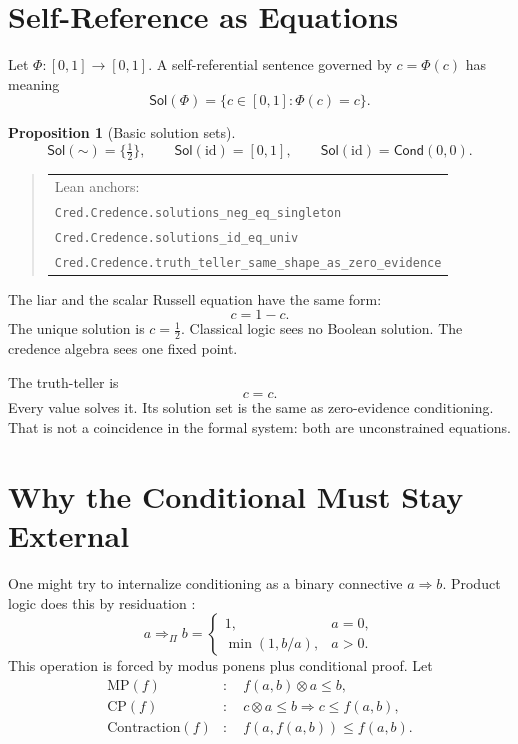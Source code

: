 \documentclass[11pt,a4paper]{article}
\newtheorem{proposition}[theorem]{Proposition}
\newcommand{\Cond}{\mathsf{Cond}}
\newcommand{\Sol}{\mathsf{Sol}}
\newcommand{\negc}{\mathord{\sim}}
\newcommand{\conjc}{\otimes}
\newcommand{\half}{\tfrac12}
\newcommand{\Lean}[1]{\texttt{#1}}
\begin{document}
\section{Self-Reference as Equations}

Let $\Phi:[0,1]\to[0,1]$.  A self-referential sentence governed by
$c=\Phi(c)$ has meaning
\[
  \Sol(\Phi)=\{c\in[0,1]:\Phi(c)=c\}.
\]

\begin{proposition}[Basic solution sets]
\label{prop:solution-sets}
\[
  \Sol(\negc)=\{\half\},\qquad
  \Sol(\mathrm{id})=[0,1],\qquad
  \Sol(\mathrm{id})=\Cond(0,0).
\]
\end{proposition}

\noindent
\begin{quote}\scriptsize
\begin{tabular}{@{}l@{}}
Lean anchors: \\
\Lean{Cred.Credence.solutions\_neg\_eq\_singleton}\\
\Lean{Cred.Credence.solutions\_id\_eq\_univ}\\
\Lean{Cred.Credence.truth\_teller\_same\_shape\_as\_zero\_evidence}
\end{tabular}
\end{quote}

The liar and the scalar Russell equation have the same form:
\[
  c=1-c.
\]
The unique solution is $c=\half$.  Classical logic sees no Boolean
solution.  The credence algebra sees one fixed point.

The truth-teller is
\[
  c=c.
\]
Every value solves it.  Its solution set is the same as zero-evidence
conditioning.  That is not a coincidence in the formal system: both
are unconstrained equations.

\section{Why the Conditional Must Stay External}

One might try to internalize conditioning as a binary connective
$a\Rightarrow b$.  Product logic does this by residuation
\cite{hajek1998,esteva2001,galatos2007}:
\[
  a\Rightarrow_{\Pi} b=
  \begin{cases}
    1, & a=0,\\
    \min(1,b/a), & a>0.
  \end{cases}
\]
This operation is forced by modus ponens plus conditional proof.
Let
\[
\begin{aligned}
\mathrm{MP}(f)&:\quad f(a,b)\conjc a\le b,\\
\mathrm{CP}(f)&:\quad c\conjc a\le b\Rightarrow c\le f(a,b),\\
\mathrm{Contraction}(f)&:\quad f(a,f(a,b))\le f(a,b).
\end{aligned}
\]
\end{document}
